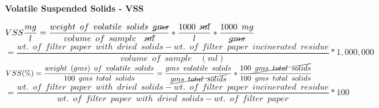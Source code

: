 \vspace{0.4cm}
\textbf{Volatile Suspended Solids - VSS}	
\vspace{0.4cm}

$VSS \dfrac{mg}{l}=\dfrac{weight \enspace of \enspace volatile \enspace solids \enspace \cancel{gms}}{volume \enspace of \enspace sample \enspace \enspace \cancel{ml}}*\dfrac{1000 \enspace \cancel{ml}}{l}*\dfrac{1000 \enspace mg}{\cancel{gms}}$\\
\vspace{0.3cm}
\hspace{1.4cm}$=\dfrac{wt. \enspace of \enspace filter \enspace paper  \enspace with \enspace dried  \enspace solids - wt. \enspace of \enspace filter \enspace paper \enspace incinerated \enspace residue}{volume \enspace of \enspace sample \enspace \enspace (ml)}*1,000,000$\\
\vspace{0.3cm}
$VSS(\%)=\dfrac{weight \enspace (gms) \enspace of \enspace volatile \enspace solids}{100 \enspace gms \enspace total \enspace solids}=\dfrac{gms \enspace volatile \enspace solids}{\cancel{gms \enspace total \enspace solids}}*\dfrac{100 \cancel{\enspace gms \enspace total \enspace solids}}{100 \enspace gms \enspace total \enspace solids}$\\
\vspace{0.3cm}
\hspace{1.5cm}\small{$=\dfrac{wt. \enspace of \enspace filter \enspace paper  \enspace with \enspace dried  \enspace solids - wt. \enspace of \enspace filter \enspace paper \enspace incinerated \enspace residue}{wt. \enspace of \enspace filter \enspace paper  \enspace with \enspace dried  \enspace solids - wt. \enspace of \enspace filter \enspace paper}*100$}\\				

